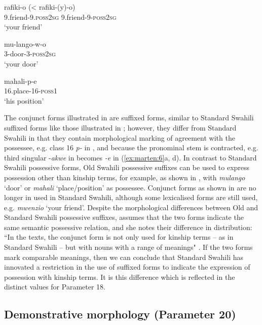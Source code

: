 \documentclass[output=paper]{langscibook}
\begin{document}
    \ex\label{ex:marten:6b} \gll rafiki-o             (<   rafiki-(y)-o)\\
  9.friend-9.\textsc{poss2sg}   {}   9.friend-9-\textsc{poss2sg}  \\
    \glt ‘your friend’ \citep[161]{Miehe1979}

    \ex\label{ex:marten:6c} \gll mu-lango-w-o \\
  3-door-3-\textsc{poss2sg}\\
 \glt ‘your door’ \citep[161]{Miehe1979}

    \ex\label{ex:marten:6d} \gll mahali-p-e \\
    16.place-16-\textsc{poss1}\\
    \glt ‘his position’ \citep[162]{Miehe1979}
    \z
\z

The conjunct forms illustrated in  are suffixed forms, similar to Standard Swahili suffixed forms like those illustrated in ; however, they differ from Standard Swahili in that they contain morphological marking of agreement with the possessee, e.g. class 16 \textit{p-} in , and because  the pronominal stem is contracted, e.g. third singular -\textit{akwe} in  becomes \textit{{}-e} in (\ref{ex:marten:6}a, d). In contrast to Standard Swahili possessive forms, Old Swahili possessive suffixes can be used to express possession other than kinship terms, for example, as shown in , with \textit{mulango} ‘door’  or \textit{mahali} ‘place/position’  as possessee. Conjunct forms as shown in  are no longer in used in Standard Swahili, although some lexicalised forms are still used, e.g. \textit{mwenzio} ‘your friend’. Despite the morphological differences between Old and Standard Swahili possessive suffixes, \citet{Miehe1979} assumes that the two forms indicate the same semantic possessive relation, and she notes their difference in distribution: “In the texts, the conjunct form is not only used for kinship terms -- as in Standard Swahili -- but with nouns with a range of meanings" \citep[168]{Miehe1979}. If the two forms mark comparable meanings, then we can conclude that Standard Swahili has innovated a restriction in the use of suffixed forms to indicate the expression of possession with kinship terms. It is this difference which is reflected in the distinct values for Parameter 18. 

\subsection{Demonstrative morphology (Parameter 20)}\label{sec:marten:3.2}
\end{document}

